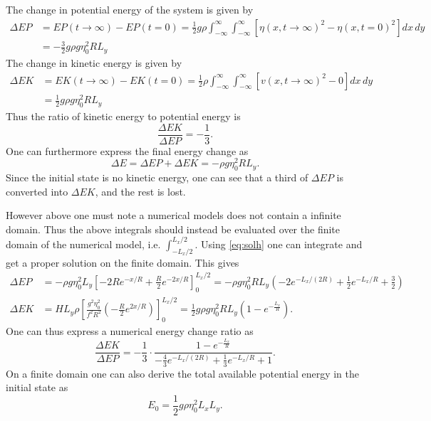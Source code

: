The change in potential energy of the system is given by
\begin{equation}
    \begin{aligned}
    \Delta EP &= EP(t\rightarrow\infty)-EP(t=0)  =\frac{1}{2} g\rho \int_{-\infty}^{\infty}\int_{-\infty}^{\infty} \left[\eta(x,t\rightarrow\infty)^2-\eta(x,t=0)^2\right] dx\, dy \\ 
    &= -\frac{3}{2}g
    \rho g \eta_0^2 R L_y
    \end{aligned}
\end{equation}
The change in kinetic energy is given by
\begin{equation}
    \begin{aligned}
    \Delta EK &= EK(t\rightarrow\infty)-EK(t=0) = \frac{1}{2} \rho \int_{-\infty}^{\infty}\int_{-\infty}^{\infty} \left[v(x,t\rightarrow\infty)^2-0\right] dx \, dy \\
    &= \frac{1}{2} g\rho g \eta_0^2 R L_y
    \end{aligned}
\end{equation}
Thus the ratio of kinetic energy to potential energy is
\begin{equation}
    \frac{\Delta EK}{\Delta EP} = -\frac{1}{3}.
\end{equation}
One can furthermore express the final energy change as
\begin{equation}
    \Delta E = \Delta EP + \Delta EK = -\rho g \eta_0^2 R L_y.
\end{equation}
Since the initial state is no kinetic energy, one can see that a third of $\Delta EP$ is converted into $\Delta EK$, and the rest is lost. 

However above one must note a numerical models does not contain a infinite domain. Thus the above integrals should instead be evaluated over the finite domain of the numerical model, i.e. $\int_{-L_x/2}^{L_x/2}$. Using \autoref{eq:solh} one can integrate and get a proper solution on the finite domain. This gives
\begin{align}
    \Delta EP &= -\rho g\eta_0^2 L_y \left[-2Re^{-x/R}+\frac{R}{2}e^{-2x/R}\right]_0^{L_x/2} = -\rho g \eta_0^2 R L_y
\left(-2 e^{-L_x/(2R)} + \frac{1}{2} e^{-L_x/R} + \frac{3}{2}\right) \\ 
    \Delta EK &= HL_y\rho\left[\frac{g^2\eta_0^2}{f^2R^2}\left(-\frac{R}{2}e^{2x/R}\right)\right]_0^{L_x/2} = \frac{1}{2}g\rho g \eta_0^2 R L_y \left(1-e^{-\frac{L_x}{R}}\right). 
\end{align}
One can thus express a numerical energy change ratio as 
\begin{equation}
    \frac{\Delta EK}{\Delta EP} = -\frac{1}{3}\cdot\frac{1-e^{-\frac{L_x}{R}}}{-\tfrac{4}{3} e^{-L_x/(2R)} + \tfrac{1}{3} e^{-L_x/R} + 1}.
\end{equation}
On a finite domain one can also derive the total available potential energy in the initial state as 
\begin{equation}
    E_0 = \frac{1}{2}g\rho\eta_0^2L_xL_y.
\end{equation}

